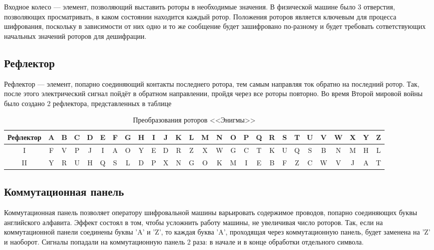 Входное колесо --- элемент, позволяющий выставить роторы в необходимые значения. 
В физической машине было 3 отверстия, позволяющих просматривать, в каком состоянии находится каждый ротор.
Положения роторов является ключевым для процесса шифрования, поскольку в зависимости от них одно и то же сообщение будет зашифровано по-разному и будет требовать сответствующих начальных значений роторов для дешифрации.

\subsection{Рефлектор}

Рефлектор --- элемент, попарно соединяющий контакты последнего ротора, тем самым направляя ток обратно на последний ротор. Так, после этого электрический сигнал пойдёт в обратном направлении, пройдя через все роторы повторно. 
Во время Второй мировой войны было создано 2 рефлектора, представленных в таблице

\begin{table}[h]
\small
\setlength{\tabcolsep}{3pt}
	\begin{center}
		\begin{threeparttable}
		\captionsetup{justification=raggedright,singlelinecheck=off}
		\caption{\label{tbl:reflectors} Преобразования роторов <<Энигмы>>}
		\begin{tabular}{|c|c|c|c|c|c|c|c|c|c|c|c|c|c|c|c|c|c|c|c|c|c|c|c|c|c|c|}
			\hline
			Рефлектор & A & B & C & D & E & F & G & H & I & J & K & L & M & N & O & P & Q & R & S & T & U & V & W & X & Y & Z \\
			\hline
			I & F & V & P & J & I & A & O & Y & E & D & R & Z & X & W & G & C & T & K & U & Q & S & B & N & M & H & L \\
			\hline
			II & Y & R & U & H & Q & S & L & D & P & X & N & G & O & K & M & I & E & B & F & Z & C & W & V & J & A & T \\
			\hline
		\end{tabular}
		\end{threeparttable}
	\end{center}
	
\end{table}

\subsection{Коммутационная панель}

Коммутационная панель позволяет оператору шифровальной машины варьировать содержимое проводов, попарно соединяющих буквы английского алфавита. 
Эффект состоял в том, чтобы усложнить работу машины, не увеличивая число роторов.
Так, если на коммутационной панели соединены буквы 'A' и 'Z', то каждая буква 'A', проходящая через коммутационную панель, будет заменена на 'Z'  и наоборот. Сигналы попадали на коммутационную панель 2 раза: в начале и в конце обработки отдельного символа.

